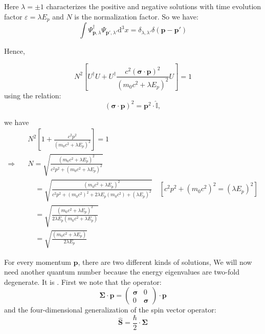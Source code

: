 Here $\lambda = \pm 1$ characterizes the positive and negative solutions with time evolution factor $\varepsilon = \lambda E_p$ and $N$ is the normalization factor. So we have:
\begin{equation}
\int \Psi_{\bm{p},\lambda}^\dagger \Psi_{\bm{p}',\lambda'}^{} \mathrm{d}^3 x = \delta_{\lambda, \lambda'} \delta(\bm{p} - \bm{p}')
\end{equation}

Hence,

\begin{equation}
N^2 \left[ U^\dagger U + U^\dagger \frac{c^2 (\bm{\sigma}\cdot\bm{p})^2}{(m_0 c^2 + \lambda E_p)^2} U \right] = 1
\end{equation}
using the relation:
\begin{equation}
(\bm{\sigma}\cdot\bm{p})^2 = \bm{p}^2 \cdot \hat{\mathbb{I}},
\end{equation}

we have
\begin{equation}
\begin{aligned}
& N^2 \left[ 1 + \frac{c^2 p^2}{(m_0 c^2 + \lambda E_p)^2} \right] = 1 \\
\Rightarrow \quad & N = \sqrt{\frac{(m_0 c^2 + \lambda E_p)^2}{c^2 p^2 + (m_0 c^2 + \lambda E_p)^2}} \\
&\quad = \sqrt{\frac{(m_0 c^2 + \lambda E_p)^2}{c^2 p^2 + (m_0 c^2)^2 + 2\lambda E_p(m_0 c^2) + (\lambda E_p)^2}} \quad [c^2 p^2 + (m_0 c^2)^2 = (\lambda E_p)^2] \\
&\quad = \sqrt{\frac{(m_0 c^2 + \lambda E_p)^2}{2\lambda E_p (m_0 c^2 + \lambda E_p)}} \\
&\quad = \sqrt{\frac{(m_0 c^2 + \lambda E_p)}{2\lambda E_p}}
\end{aligned}
\end{equation}

For every momentum $\bm{p}$, there are two different kinds of solutions, We will now need another quantum number because the energy eigenvalues are two-fold degenerate. It is . First we note that the operator:
\begin{equation}
\bm{\Sigma}\cdot\bm{p} = \begin{pmatrix} \bm{\sigma} & 0 \\ 0 & \bm{\sigma} \end{pmatrix} \cdot \bm{p}
\end{equation}
and the four-dimensional generalization of the spin vector operator:
\begin{equation}
\hat{\bm{S}} = \frac{\hbar}{2} \cdot \bm{\Sigma}
\end{equation}

